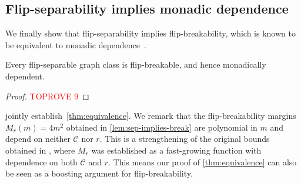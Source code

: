 \documentclass[a4paper,UKenglish,cleveref, autoref, thm-restate]{lipics-v2021}
\newcommand{\CC}{\mathcal{C}}
\begin{document}
\subsection{Flip-separability implies monadic dependence}

We finally show that flip-separability implies flip-breakability, which is known to be equivalent to monadic dependence~\cite{flip-breakability}.

\begin{lemma}\label{lem:sep-implies-break}
   Every flip-separable graph class is flip-breakable, and hence monadically dependent. 
\end{lemma}
\begin{proof}\textcolor{red}{TOPROVE 9}\end{proof}

 jointly establish~\cref{thm:equivalence}. We remark that the flip-breakability margins $M_r(m) = 4m^2$ obtained in \cref{lem:sep-implies-break} are polynomial in $m$ and depend on neither $\CC$ nor $r$. This is a strengthening of the original bounds obtained in \cite{flip-breakability}, where $M_r$ was established as a fast-growing function with dependence on both $\CC$ and $r$.
This means our proof of \cref{thm:equivalence} can also be seen as a boosting argument for flip-breakability.
 





\appendix
\end{document}
